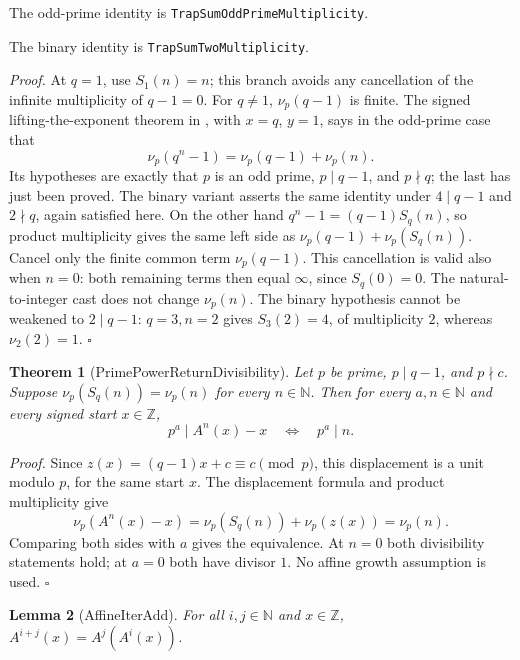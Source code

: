 \documentclass[11pt,letterpaper]{article}
\newcommand{\N}{\mathbb{N}}
\newcommand{\Z}{\mathbb{Z}}
\newtheorem{theorem}{Theorem}
\newtheorem{lemma}[theorem]{Lemma}
\newenvironment{proof}{\noindent\textit{Proof.}}{\hfill\(\square\)}
\begin{document}
The odd-prime identity is \texttt{Trap\allowbreak Sum\allowbreak Odd\allowbreak Prime\allowbreak Multiplicity}.

The binary identity is \texttt{Trap\allowbreak Sum\allowbreak Two\allowbreak Multiplicity}.

\begin{proof}
At \(q=1\), use \(S_1(n)=n\); this branch avoids any cancellation
of the infinite multiplicity of \(q-1=0\).
For \(q\ne1\), \(\nu_p(q-1)\) is finite. The signed
lifting-the-exponent theorem in \cite{MathlibMultiplicity26}, with
\(x=q\), \(y=1\), says in the odd-prime case that
\[
 \nu_p(q^n-1)=\nu_p(q-1)+\nu_p(n).
\]
Its hypotheses are exactly that \(p\) is an odd prime,
\(p\mid q-1\), and \(p\nmid q\); the last has just been proved.
The binary variant asserts the same identity under
\(4\mid q-1\) and \(2\nmid q\), again satisfied here.
On the other hand \(q^n-1=(q-1)S_q(n)\), so product
multiplicity gives the same left side as
\(\nu_p(q-1)+\nu_p(S_q(n))\).
Cancel only the finite common term \(\nu_p(q-1)\).
This cancellation is valid also when \(n=0\): both remaining
terms then equal \(\infty\), since \(S_q(0)=0\).
The natural-to-integer cast does not change \(\nu_p(n)\).
The binary hypothesis cannot be weakened to \(2\mid q-1\):
\(q=3,n=2\) gives \(S_3(2)=4\), of multiplicity \(2\),
whereas \(\nu_2(2)=1\).
\end{proof}

\begin{theorem}[PrimePowerReturnDivisibility]
Let \(p\) be prime, \(p\mid q-1\), and \(p\nmid c\).
Suppose \(\nu_p(S_q(n))=\nu_p(n)\) for every \(n\in\N\).
Then for every \(a,n\in\N\) and every signed start \(x\in\Z\),
\[
 p^a\mid A^n(x)-x\quad\Longleftrightarrow\quad p^a\mid n.
\]
\end{theorem}

\begin{proof}
Since \(z(x)=(q-1)x+c\equiv c\pmod p\), this displacement
is a unit modulo \(p\), for the same start \(x\).
The displacement formula and product multiplicity give
\[
 \nu_p(A^n(x)-x)=\nu_p(S_q(n))+\nu_p(z(x))=\nu_p(n).
\]
Comparing both sides with \(a\) gives the equivalence.
At \(n=0\) both divisibility statements hold; at \(a=0\)
both have divisor \(1\). No affine growth assumption is used.
\end{proof}

\begin{lemma}[AffineIterAdd]
For all \(i,j\in\N\) and \(x\in\Z\),
\(A^{i+j}(x)=A^j(A^i(x))\).
\end{lemma}
\end{document}
